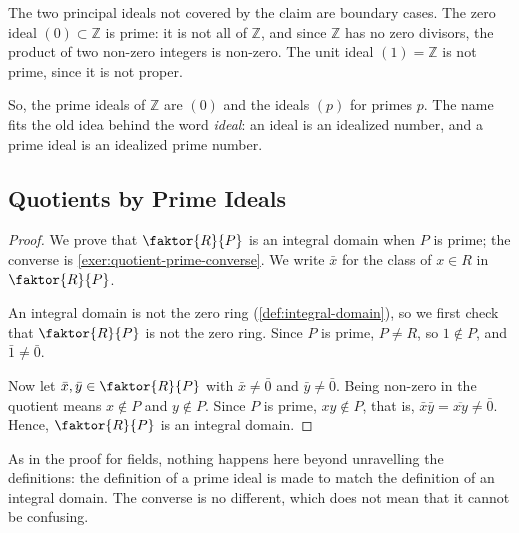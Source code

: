 The two principal ideals not covered by the claim are boundary cases. The zero ideal $(0) \subset \mathbb{Z}$ is prime: it is not all of $\mathbb{Z}$, and since $\mathbb{Z}$ has no zero divisors, the product of two non-zero integers is non-zero. The unit ideal $(1) = \mathbb{Z}$ is not prime, since it is not proper.


So, the prime ideals of $\mathbb{Z}$ are $(0)$ and the ideals $(p)$ for primes $p$. The name fits the old idea behind the word \emph{ideal}: an ideal is an idealized number, and a prime ideal is an idealized prime number.

\subsection{Quotients by Prime Ideals}


\begin{proof}
We prove that $\faktor{R}{P}$ is an integral domain when $P$ is prime; the converse is \cref{exer:quotient-prime-converse}. We write $\bar{x}$ for the class of $x \in R$ in $\faktor{R}{P}$.

An integral domain is not the zero ring (\cref{def:integral-domain}), so we first check that $\faktor{R}{P}$ is not the zero ring. Since $P$ is prime, $P \neq R$, so $1 \notin P$, and $\bar{1} \neq \bar{0}$.

Now let $\bar{x}, \bar{y} \in \faktor{R}{P}$ with $\bar{x} \neq \bar{0}$ and $\bar{y} \neq \bar{0}$. Being non-zero in the quotient means $x \notin P$ and $y \notin P$. Since $P$ is prime, $x y \notin P$, that is, $\bar{x} \bar{y} = \overline{x y} \neq \bar{0}$. Hence, $\faktor{R}{P}$ is an integral domain.
\end{proof}

As in the proof for fields, nothing happens here beyond unravelling the definitions: the definition of a prime ideal is made to match the definition of an integral domain. The converse is no different, which does not mean that it cannot be confusing.


